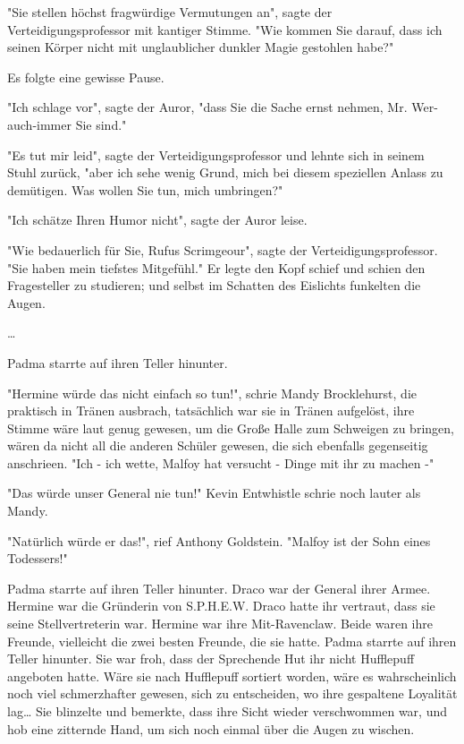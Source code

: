 {"Sie stellen höchst fragwürdige Vermutungen an", sagte der Verteidigungsprofessor mit kantiger Stimme. "Wie kommen Sie darauf, dass ich seinen Körper nicht mit unglaublicher dunkler Magie gestohlen habe?"

Es folgte eine gewisse Pause.

"Ich schlage vor", sagte der Auror, "dass Sie die Sache ernst nehmen, Mr. Wer-auch-immer Sie sind."

"Es tut mir leid", sagte der Verteidigungsprofessor und lehnte sich in seinem Stuhl zurück, "aber ich sehe wenig Grund, mich bei diesem speziellen Anlass zu demütigen. Was wollen Sie tun, mich umbringen?"

"Ich schätze Ihren Humor nicht", sagte der Auror leise.

"Wie bedauerlich für Sie, Rufus Scrimgeour", sagte der Verteidigungsprofessor. "Sie haben mein tiefstes Mitgefühl." Er legte den Kopf schief und schien den Fragesteller zu studieren; und selbst im Schatten des Eislichts funkelten die Augen.

…

Padma starrte auf ihren Teller hinunter.

"Hermine würde das nicht einfach so tun!", schrie Mandy Brocklehurst, die praktisch in Tränen ausbrach, tatsächlich war sie in Tränen aufgelöst, ihre Stimme wäre laut genug gewesen, um die Große Halle zum Schweigen zu bringen, wären da nicht all die anderen Schüler gewesen, die sich ebenfalls gegenseitig anschrieen. "Ich - ich wette, Malfoy hat versucht - Dinge mit ihr zu machen -"

"Das würde unser General nie tun!" Kevin Entwhistle schrie noch lauter als Mandy.

"Natürlich würde er das!", rief Anthony Goldstein. "Malfoy ist der Sohn eines Todessers!"

Padma starrte auf ihren Teller hinunter. Draco war der General ihrer Armee. Hermine war die Gründerin von S.P.H.E.W. Draco hatte ihr vertraut, dass sie seine Stellvertreterin war. Hermine war ihre Mit-Ravenclaw. Beide waren ihre Freunde, vielleicht die zwei besten Freunde, die sie hatte. Padma starrte auf ihren Teller hinunter. Sie war froh, dass der Sprechende Hut ihr nicht Hufflepuff angeboten hatte. Wäre sie nach Hufflepuff sortiert worden, wäre es wahrscheinlich noch viel schmerzhafter gewesen, sich zu entscheiden, wo ihre gespaltene Loyalität lag… Sie blinzelte und bemerkte, dass ihre Sicht wieder verschwommen war, und hob eine zitternde Hand, um sich noch einmal über die Augen zu wischen.

}
